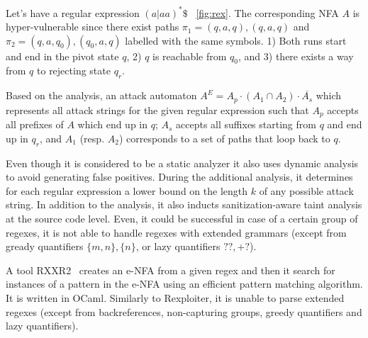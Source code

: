\documentclass[acmsmall,screen]{acmart}
\begin{document}
\begin{example}
Let's have a regular expression $(a|aa)^*\$$ ~\cref{fig:rex}. The corresponding NFA $A$ is hyper-vulnerable since
there exist paths $\pi_1 = (q,a,q),(q,a,q)$ and $\pi_2 = (q,a,q_0),(q_0,a,q)$ labelled with the same symbols.
%
1) Both runs start and end in the pivot state $q$, 2) $q$ is reachable from $q_0$, and 3) there exists a way from $q$
to rejecting state $q_r$.
\end{example}

Based on the analysis, an attack automaton 
$A^{E} = A_p \cdot (A_1 \cap A_2) \cdot \overline{A_s}$
 which represents all attack strings for the given regular expression
such that $A_p$ accepts all prefixes of $A$ which end up in $q$; 
%
$A_s$ accepts all suffixes starting from $q$ and end up in $q_r$,
%
and $A_1$ (resp. $A_2$) corresponds to a set of paths that loop back to $q$.

%
Even though it is considered to be a static analyzer it also uses dynamic analysis
% 
to avoid generating false positives.
%
During the additional analysis, it determines for each regular expression 
a lower bound on the length $k$ of any possible attack string.
%
In addition to the analysis, it also inducts sanitization-aware taint analysis at the source code level.
%
Even, it could be successful in case of a certain group of regexes,
it is not able to handle regexes with extended grammars (except from gready quantifiers $\{m,n\},\{n\}$, or lazy quantifiers $??, +?$).




A tool RXXR2~\cite{rxxr2thesis, rxxr2} creates an e-NFA from a given regex and 
then it search for instances of a pattern
in the e-NFA using an efficient pattern matching algorithm.
%
It is written in OCaml.
%
Similarly to Rexploiter, it is unable to parse extended regexes (except from backreferences, non-capturing groups, greedy quantifiers and lazy quantifiers).
%
\end{document}
